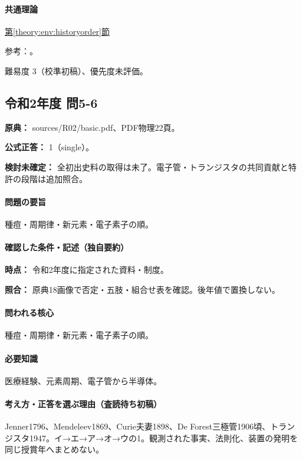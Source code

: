 \paragraph{共通理論} \hyperref[theory:env:historyorder]{第\ref*{theory:env:historyorder}節}

\par 参考：\cite{env58_steam}。

\par 難易度 3（校準初稿）、優先度未評価。

\subsection{令和2年度 問5-6}
\label{q:r02-reg-basic-5-6}

\noindent\textbf{原典：} sources/R02/basic.pdf、PDF物理22頁。

\textbf{公式正答：} 1（single）。

\par\textbf{検討未確定：} 全初出史料の取得は未了。電子管・トランジスタの共同貢献と特許の段階は追加照合。

\paragraph{問題の要旨} 種痘・周期律・新元素・電子素子の順。

\paragraph{確認した条件・記述（独自要約）}\mbox{}\par

\noindent\textbf{時点：} 令和2年度に指定された資料・制度。\par

\noindent\textbf{照合：} 原典18画像で否定・五肢・組合せ表を確認。後年値で置換しない。\par

\paragraph{問われる核心} 種痘・周期律・新元素・電子素子の順。

\paragraph{必要知識} 医療経験、元素周期、電子管から半導体。

\paragraph{考え方・正答を選ぶ理由（査読待ち初稿）} Jenner1796、Mendeleev1869、Curie夫妻1898、De Forest三極管1906頃、トランジスタ1947。イ→エ→ア→オ→ウの1。観測された事実、法則化、装置の発明を同じ授賞年へまとめない。

